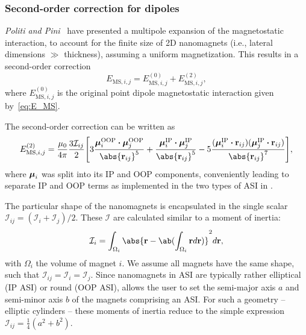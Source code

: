 \subsubsection{Second-order correction for dipoles}
\textit{Politi and Pini}~\cite{Dipolar2Dparticles} have presented a multipole expansion of the magnetostatic interaction, to account for the finite size of 2D nanomagnets (i.e., lateral dimensions $\gg$ thickness), assuming a uniform magnetization.
This results in a second-order correction
\begin{equation}
	E_{\mathrm{MS},i,j} = E_{\mathrm{MS},i,j}^\mathrm{(0)} + E_{\mathrm{MS},i,j}^\mathrm{(2)} \mathrm{,}
\end{equation}
where $E_{\mathrm{MS},i,j}^\mathrm{(0)}$ is the original point dipole magnetostatic interaction given by~\cref{eq:E_MS}. \par
The second-order correction can be written as
\begin{equation}
	E_{\mathrm{MS},i,j}^\mathrm{(2)} = \frac{\mu_0}{4\pi} \frac{3\mathcal{I}_{ij}}{2} \Bigg[3\frac{\vc{\mu}_i^\mathrm{OOP} \bcdot \vc{\mu}_j^\mathrm{OOP}}{\abs{\vc{r}_{ij}}^5} + \frac{\vc{\mu}_i^\mathrm{IP} \bcdot \vc{\mu}_j^\mathrm{IP}}{\abs{\vc{r}_{ij}}^5} -5\frac{(\vc{\mu}_i^\mathrm{IP} \bcdot \vc{r}_{ij}) (\vc{\mu}_j^\mathrm{IP} \bcdot \vc{r}_{ij})}{\abs{\vc{r}_{ij}}^7} \Bigg] \mathrm{,}
\end{equation}
where $\boldsymbol{\mathbf{\mu}}_i$ was split into its IP and OOP components, conveniently leading to separate IP and OOP terms as implemented in the two types of ASI in \hotspice. \par
The particular shape of the nanomagnets is encapsulated in the single scalar $\mathcal{I}_{ij} = (\mathcal{I}_i + \mathcal{I}_j)/2$.
These $\mathcal{I}$ are calculated similar to a moment of inertia:
\begin{equation}
	\mathcal{I}_i = \int_{\Omega_i} \abs{\vc{r} - \ab(\int_{\Omega_i} \vc{r} d\vc{r})}^2 d\vc{r} \mathrm{,}
\end{equation}
with $\Omega_i$ the volume of magnet $i$.
We assume all magnets have the same shape, such that $\mathcal{I}_{ij} = \mathcal{I}_i = \mathcal{I}_j$.
Since nanomagnets in ASI are typically rather elliptical (IP ASI) or round (OOP ASI), \hotspice allows the user to set the semi-major axis $a$ and semi-minor axis $b$ of the magnets comprising an ASI.
For such a geometry -- elliptic cylinders -- these moments of inertia reduce to the simple expression $\mathcal{I}_{ij} = \frac{1}{4}(a^2 + b^2)$. %

